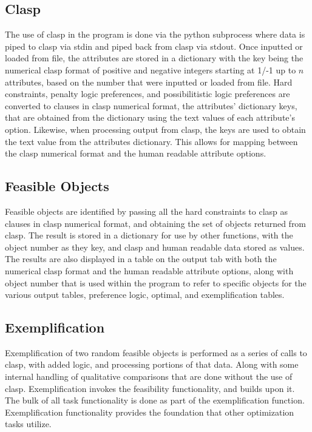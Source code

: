 \documentclass[12pt]{report}
\begin{document}
\subsection{Clasp}
The use of clasp in the program is done via the python subprocess where data is piped to clasp via stdin and piped back from clasp via stdout. Once inputted or loaded from file, the attributes are stored in a dictionary with the key being the numerical clasp format of positive and negative integers starting at 1/-1 up to $n$ attributes, based on the number that were inputted or loaded from file. Hard constraints, penalty logic preferences, and possibilitistic logic preferences are converted to clauses in clasp numerical format, the attributes' dictionary keys, that are obtained from the dictionary using the text values of each attribute's option. Likewise, when processing output from clasp, the keys are used to obtain the text value from the attributes dictionary. This allows for mapping between the clasp numerical format and the human readable attribute options.

\newpage
\subsection{Feasible Objects}
Feasible objects are identified by passing all the hard constraints to clasp as clauses in clasp numerical format, and obtaining the set of objects returned from clasp. The result is stored in a dictionary for use by other functions, with the object number as they key, and clasp and human readable data stored as values. The results are also displayed in a table on the output tab with both the numerical clasp format and the human readable attribute options, along with object number that is used within the program to refer to specific objects for the various output tables, preference logic, optimal, and exemplification tables.

\subsection{Exemplification}
Exemplification of two random feasible objects is performed as a series of calls to clasp, with added logic, and processing portions of that data. Along with some internal handling of qualitative comparisons that are done without the use of clasp. Exemplification invokes the feasibility functionality, and builds upon it. The bulk of all task functionality is done as part of the exemplification function. Exemplification functionality provides the foundation that other optimization tasks utilize.\\
\end{document}
